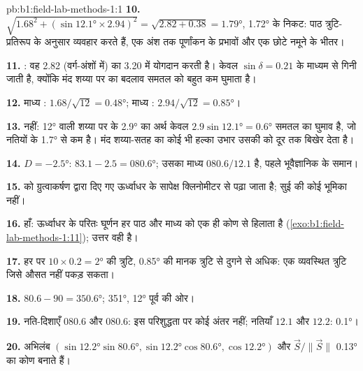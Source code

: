 \begin{solution}{pb:b1:field-lab-methods-1:1}
\textbf{10.} $\sqrt{1.68^2 + (\sin\ang{12.1}\times2.94)^2} = \sqrt{2.82 +
0.38} = \ang{1.79}$, \ang{1.72} के निकट: पाठ त्रुटि-प्रतिरूप के अनुसार व्यवहार करते हैं, एक अंश तक पूर्णांकन के प्रभावों
और एक छोटे नमूने के भीतर।

\textbf{11.} : वह 2.82 (वर्ग-अंशों में) का 3.20 में योगदान करती है।  केवल $\sin\delta = 0.21$ के
माध्यम से गिनी जाती है, क्योंकि मंद शय्या पर  का बदलाव समतल को बहुत कम घुमाता है।

\textbf{12.} माध्य : $1.68/\sqrt{12} = \ang{0.48}$; माध्य :
$2.94/\sqrt{12} = \ang{0.85}$।

\textbf{13.} नहीं: \ang{12}  वाली शय्या पर  के \ang{2.9} का अर्थ केवल
$2.9\sin\ang{12.1} = \ang{0.6}$ समतल का घुमाव है, जो नतियों के \ang{1.7} से कम है। मंद शय्या-सतह का कोई भी हल्का
उभार उसकी  को दूर तक बिखेर देता है।

\textbf{14.} $D = \ang{-2.5}$: $83.1 - 2.5 = \ang{080.6}$; उसका माध्य $080.6/12.1$ है, पहले भूवैज्ञानिक के समान।

\textbf{15.}  को ग्रुत्वाकर्षण द्वारा दिए गए ऊर्ध्वाधर के सापेक्ष क्लिनोमीटर से पढ़ा जाता है; सुई की कोई भूमिका नहीं।

\textbf{16.} हाँ: ऊर्ध्वाधर के परितः घूर्णन हर पाठ और माध्य को एक ही कोण से हिलाता है (\cref{exo:b1:field-lab-methods-1:11});
उत्तर वही है।

\textbf{17.} हर  पर $10\times0.2 = \ang{2}$ की त्रुटि, \ang{0.85} की मानक त्रुटि से दुगने से अधिक: एक व्यवस्थित
त्रुटि जिसे औसत नहीं पकड़ सकता।

\textbf{18.} $80.6 - 90 = \ang{350.6}$;   \ang{351},  \ang{12} पूर्व की ओर।

\textbf{19.} नति-दिशाएँ $080.6$ और $080.6$: इस परिशुद्धता पर कोई अंतर नहीं; नतियाँ $12.1$ और $12.2$: \ang{0.1}।

\textbf{20.} अभिलंब $(\sin\ang{12.2}\sin\ang{80.6},
\sin\ang{12.2}\cos\ang{80.6}, \cos\ang{12.2})$ और $\vec S/\|\vec S\|$ \ang{0.13} का कोण बनाते हैं।


\end{solution}
